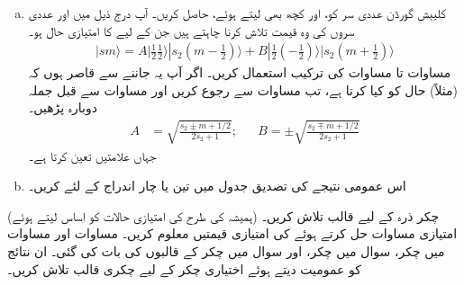 \begin{enumerate}[a.]
\item 
 کلیبش گورڈن عددی سر کو،  اور  کچھ بھی لیتے ہوئے، حاصل کریں۔ آپ درج ذیل میں  اور  عددی سروں کی وہ قیمت تلاش کرنا چاہتے ہیں جن کے لیے کا امتیازی حال  ہو۔ 
\begin{align*}
 |sm \rangle=A|\tfrac{1}{2}\tfrac{1}{2}\rangle|s_2(m-\tfrac{1}{2})\rangle+B|\tfrac{1}{2}(-\tfrac{1}{2})\rangle|s_2(m+\tfrac{1}{2})\rangle
\end{align*} 
مساوات  تا مساوات  کی ترکیب استعمال کریں۔ اگر آپ یہ جاننے سے قاصر ہوں
 کہ (مثلاً)  حال  کو کیا کرتا ہے، تب مساوات  سے رجوع کریں اور مساوات  سے قبل جملہ دوبارہ پڑھیں۔ 
\begin{align*}
 A&=\sqrt{\frac{s_2\pm m+1/2}{2s_2+1}}; && B=\pm \sqrt{\frac{s_2\mp m+1/2}{2s_2+1}} 
\end{align*}
جہاں  علامتیں تعین کرتا ہے۔
\item 
اس عمومی نتیجے کی تصدیق جدول  میں تین یا چار اندراج کے لئے کریں۔
\end{enumerate}
(ہمیشہ کی طرح  کی امتیازی حالات کو اساس لیتے ہوئے) چکر ذرہ کے لیے قالب  تلاش کریں۔ امتیازی مساوات حل کرتے ہوئے  کی  امتیازی قیمتیں معلوم کریں۔
مساوات  اور مساوات  میں  چکر، سوال  میں  چکر، اور سوال  میں  چکر کے قالبوں کی بات کی گئی۔ ان نتائج کو عمومیت دیتے ہوئے اختیاری  چکر کے لیے چکری قالب تلاش کریں۔
